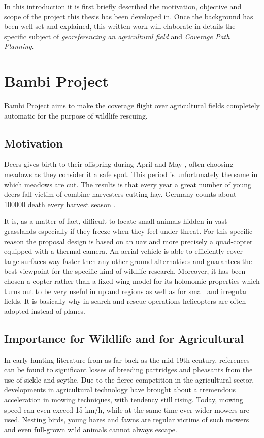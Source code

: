 


In this introduction it is first briefly described the motivation, objective and scope of the project this thesis has been developed in. Once the background has been well set and explained, this written work will elaborate in details the specific subject of \textit{georeferencing an agricultural field} and \textit{Coverage Path Planning}.

\section{Bambi Project} %
\label{sec:bambi_project}
Bambi Project aims to make the coverage flight over agricultural fields completely automatic for the purpose of wildlife rescuing.
\subsection{Motivation} %
\label{ssec:motivation}
 Deers gives birth to their offspring during April and May \cite{MowlingMortality}, often choosing meadows as they consider it a safe spot. This period is unfortunately the same in which meadows are cut. The results is that every year a great number of young deers fall victim of combine harvesters cutting hay. Germany counts about 100000 death every harvest season \cite{MowlingMortality}.\par
 It is, as a matter of fact, difficult to locate small animals hidden in vast grasslands especially if they freeze when they feel under threat. For this specific reason the proposal design is based on an \acrfull{uav}\cite{ICAO} and more precisely a quad-copter equipped with a thermal camera.
 An aerial vehicle is able to efficiently cover large surfaces way faster then any other ground alternatives and guarantees the best viewpoint for the specific kind of wildlife research. Moreover, it has been chosen a copter rather than a fixed wing model for its holonomic properties which turns out to be very useful in upland regions as well as for small and irregular fields. It is basically why in search and rescue operations helicopters are often adopted instead of planes.

\subsection{Importance for Wildlife and for Agricultural}
In early hunting literature from as far back as the mid-19th century, references can be found to significant losses of breeding partridges and pheasants from the use of sickle and scythe. Due to the fierce competition in the agricultural sector, developments in agricultural technology have brought about a tremendous acceleration in mowing techniques, with tendency still rising. Today, mowing speed can even exceed 15 km/h, while at the same time ever-wider mowers are used. Nesting birds, young hares and fawns are regular victims of such mowers and even full-grown wild animals cannot always escape.

